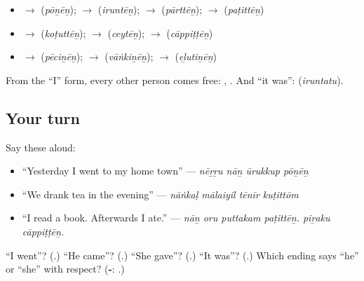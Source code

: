 \begin{itemize}
\raggedright
  \item \textbf{} $\to$ \textbf{} (\emph{pōṉēṉ}); \textbf{} $\to$ \textbf{} (\emph{iruntēṉ}); \textbf{} $\to$ \textbf{} (\emph{pārttēṉ}); \textbf{} $\to$ \textbf{} (\emph{paṭittēṉ})
  \item \textbf{} $\to$ \textbf{} (\emph{koṭuttēṉ}); \textbf{} $\to$ \textbf{} (\emph{ceytēṉ}); \textbf{} $\to$ \textbf{} (\emph{cāppiṭṭēṉ})
  \item \textbf{} $\to$ \textbf{} (\emph{pēciṉēṉ}); \textbf{} $\to$ \textbf{} (\emph{vāṅkiṉēṉ}); \textbf{} $\to$ \textbf{} (\emph{eḻutiṉēṉ})
\end{itemize}

From the \textquotedblleft{}I\textquotedblright{} form, every other person comes free: \textbf{}, \textbf{}. And \textquotedblleft{}it was\textquotedblright{}: \textbf{} (\emph{iruntatu}).

\subsection*{Your turn}
Say these aloud:

\begin{itemize}
\raggedright
  \item \textquotedblleft{}Yesterday I went to my home town\textquotedblright{} — \emph{nēṟṟu nāṉ ūrukkup pōṉēṉ}
  \item \textquotedblleft{}We drank tea in the evening\textquotedblright{} — \emph{nāṅkaḷ mālaiyil tēnīr kuṭittōm}
  \item \textquotedblleft{}I read a book. Afterwards I ate.\textquotedblright{} — \emph{nāṉ oru puttakam paṭittēṉ. piṟaku cāppiṭṭēṉ.}
\end{itemize}

\begin{tcolorbox}[breakable,colback=teal!4,colframe=teal!35!black,title={Before you move on}]
\textquotedblleft{}I went\textquotedblright{}? (\textbf{}.) \textquotedblleft{}He came\textquotedblright{}? (\textbf{}.) \textquotedblleft{}She gave\textquotedblright{}? (\textbf{}.) \textquotedblleft{}It was\textquotedblright{}? (\textbf{}.) Which ending says \textquotedblleft{}he\textquotedblright{} or \textquotedblleft{}she\textquotedblright{} with respect? (\textbf{-}: \textbf{}.)
\end{tcolorbox}
